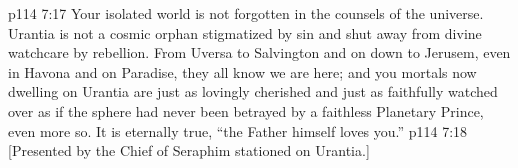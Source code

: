 \vs p114 7:17 Your isolated world is not forgotten in the counsels of the universe. Urantia is not a cosmic orphan stigmatized by sin and shut away from divine watchcare by rebellion. From Uversa to Salvington and on down to Jerusem, even in Havona and on Paradise, they all know we are here; and you mortals now dwelling on Urantia are just as lovingly cherished and just as faithfully watched over as if the sphere had never been betrayed by a faithless Planetary Prince, even more so. It is eternally true, “the Father himself loves you.”
\vsetoff
\vs p114 7:18 [Presented by the Chief of Seraphim stationed on Urantia.]
\quizlink
